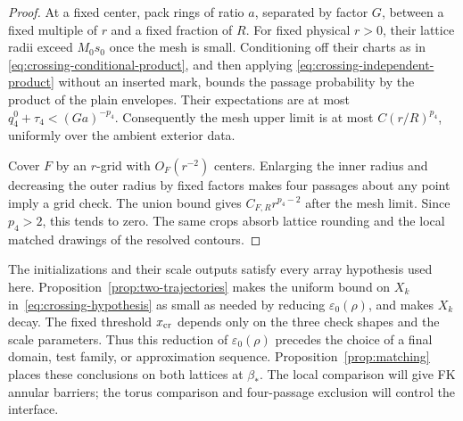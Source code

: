 \begin{proof}
At a fixed center, pack rings of ratio $a$, separated by factor $G$,
between a fixed multiple of $r$ and a fixed fraction of $R$.  For fixed
physical $r>0$, their lattice radii exceed $M_0s_0$ once the mesh is
small.  Conditioning off their charts as in
\eqref{eq:crossing-conditional-product}, and then applying
\eqref{eq:crossing-independent-product} without an inserted mark,
bounds the passage probability by the product of the plain envelopes.
Their expectations are at most $q_4^0+\tau_4<(Ga)^{-p_4}$.
Consequently the mesh upper limit is at most $C(r/R)^{p_4}$, uniformly
over the ambient exterior data.

Cover $F$ by an $r$-grid with $O_F(r^{-2})$ centers.  Enlarging the inner
radius and decreasing the outer radius by fixed factors makes four
passages about any point imply a grid check.  The union bound gives
$C_{F,R}r^{p_4-2}$ after the mesh limit.  Since $p_4>2$, this tends to
zero.  The same crops absorb lattice rounding and the local matched
drawings of the resolved contours.
\end{proof}

The initializations and their scale outputs satisfy every array
hypothesis used here.  Proposition~\ref{prop:two-trajectories} makes
the uniform bound on $X_k$ in~\eqref{eq:crossing-hypothesis} as small as needed
by reducing $\varepsilon_0(\rho)$, and makes $X_k$ decay.  The fixed
threshold $x_{\rm cr}$ depends only on the three check shapes and the
scale parameters.  Thus this reduction of $\varepsilon_0(\rho)$ precedes
the choice of a final domain, test family, or approximation sequence.
Proposition~\ref{prop:matching} places these conclusions on both lattices
at $\beta_*$.  The local comparison will give FK annular barriers; the
torus comparison and four-passage exclusion will control the interface.
